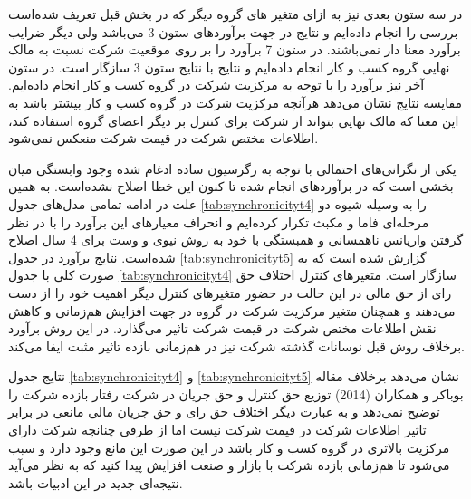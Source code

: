 \documentclass[12pt, a4paper]{article}
\begin{document}
در سه ستون بعدی نیز به ازای متغیر های گروه دیگر که در بخش قبل تعریف شده‌است بررسی را انجام داده‌ایم و نتایج در جهت برآورد‌های ستون 3 می‌باشد ولی دیگر ضرایب برآورد معنا دار نمی‌باشند. در ستون 7 برآورد را بر روی موقعیت شرکت نسبت به مالک نهایی گروه کسب و کار انجام داده‌ایم و نتایج با نتایج ستون 3 سازگار است. در ستون آخر نیز برآورد را با توجه به مرکزیت شرکت در گروه کسب و کار انجام داده‌ایم. مقایسه نتایج نشان می‌دهد هرآنچه مرکزیت شرکت در گروه کسب و کار بیشتر باشد به این معنا که مالک نهایی بتواند از شرکت برای کنترل بر دیگر اعضای گروه استفاده کند، اطلاعات مختص شرکت در قیمت شرکت منعکس نمی‌شود.

یکی از نگرانی‌های احتمالی با توجه به 
رگرسیون ساده ادغام شده 
وجود وابستگی میان بخشی است که در برآورد‌های انجام شده تا کنون این خطا اصلاح نشده‌است. به همین علت در ادامه تمامی مدل‌های جدول
\ref{tab:synchronicityt4}
را به وسیله شیوه دو مرحله‌ای 
فاما و مکبث 
	تکرار کرده‌ایم و انحراف معیار‌های این برآورد را با در نظر گرفتن واریانس ناهمسانی و همبستگی با خود 
	به روش نیوی و وست
	برای 4 سال اصلاح شده‌است. نتایج برآورد در جدول 
	\ref{tab:synchronicityt5}
	گزارش شده است که به صورت کلی با جدول 
	\ref{tab:synchronicityt4} 
	سازگار است. متغیر‌های کنترل اختلاف حق‌ رای از حق مالی  در این حالت در حضور متغیر‌های کنترل دیگر اهمیت خود را از دست می‌دهند و همچنان متغیر مرکزیت شرکت در گروه در جهت افزایش هم‌زمانی و کاهش نقش اطلاعات مختص شرکت در قیمت شرکت  تاثیر می‌گذارد. در این روش  برآورد برخلاف روش قبل نوسانات گذشته شرکت نیز در هم‌زمانی بازده تاثیر مثبت ایفا می‌کند.

نتایج جدول 
\ref{tab:synchronicityt4} 
و
\ref{tab:synchronicityt5} 
نشان می‌دهد برخلاف مقاله بوباکر و همکاران  (2014)
توزیع حق کنترل و حق جریان در شرکت رفتار بازده شرکت را توضیح نمی‌دهد و به عبارت دیگر اختلاف حق رای و حق جریان مالی مانعی در برابر تاثیر اطلاعات شرکت در قیمت شرکت نیست اما از طرفی چنانچه شرکت دارای مرکزیت بالاتری در گروه کسب و کار باشد در این صورت این مانع وجود دارد و سبب می‌شود تا هم‌زمانی بازده شرکت با بازار و صنعت افزایش پیدا کنید که به نظر می‌آید نتیجه‌ای جدید در این ادبیات باشد. 



\end{document}
